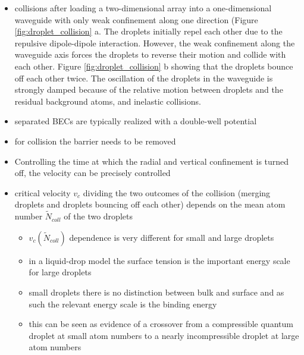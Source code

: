 \begin{itemize}
    \item collisions after loading a two-dimensional array into a one-dimensional waveguide with only
        weak confinement along one direction (Figure \ref{fig:droplet_collision} a. The droplets initially repel
        each other due to the repulsive dipole-dipole interaction. However, the weak confinement
        along the waveguide axis forces the droplets to reverse their motion and collide with each
        other. Figure \ref{fig:droplet_collision} b showing that the droplets bounce off each other twice.
        The oscillation of the droplets in the waveguide is strongly damped because of the relative motion between
        droplets and the residual background atoms, and inelastic collisions.

    \item separated BECs are typically realized with a double-well potential
    \item for collision the barrier needs to be removed
    \item Controlling the time at which the radial and vertical confinement is turned off,
        the velocity can be precisely controlled
    \item critical velocity $v_{c}$ dividing the two outcomes of the collision (merging droplets and droplets bouncing off each other) depends on the mean atom number $\tilde{N}_{coll}$ of the two droplets
    \begin{itemize}
        \item $v_{c}\left(\tilde{N}_{coll}\right)$ dependence is very different for small and large droplets
        \item in a liquid-drop model the surface tension is the important energy scale for large droplets
        \item small droplets there is no distinction between bulk and surface and as such the relevant energy scale
            is the binding energy
        \item this can be seen as evidence of a crossover from a compressible quantum droplet at small atom numbers
            to a nearly incompressible droplet at large atom numbers
    \end{itemize}
\end{itemize}

